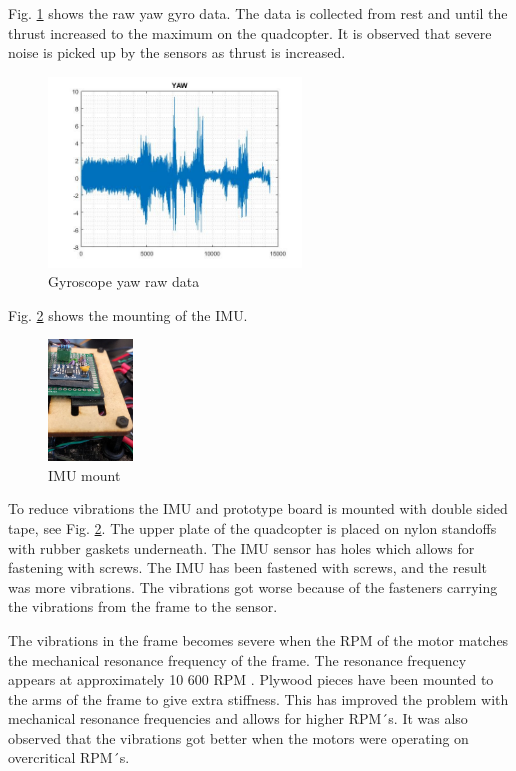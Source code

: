 Fig. \ref{fig:yo} shows the raw yaw gyro data. The data is collected from rest and until the thrust increased to the maximum on the quadcopter. It is observed that severe noise is picked up by the sensors as thrust is increased.
\begin{figure}[H]
    \centering
         \includegraphics[width = 0.6\textwidth]{VAPIQ-PICTURES/YAWshaftTrow.jpg}
      \caption{Gyroscope yaw raw data}
    \label{fig:yo}
\end{figure} 
Fig. \ref{fig:PIKK2} shows the mounting of the IMU. 
\begin{figure}[H]
    \centering
         \includegraphics[width = 0.2\textwidth]{VAPIQ-PICTURES/SensorDritt.jpg}
      \caption{IMU mount}
    \label{fig:PIKK2}
\end{figure} 
To reduce vibrations the IMU and prototype board is mounted with double sided tape, see Fig. \ref{fig:PIKK2}. The upper plate of the quadcopter is placed on nylon standoffs with rubber gaskets underneath. The IMU sensor has holes which allows for fastening with screws. The IMU has been fastened with screws, and the result was more vibrations. The vibrations got worse because of the fasteners carrying the vibrations from the frame to the sensor. \bigskip

The vibrations in the frame becomes severe when the RPM of the motor matches the mechanical resonance frequency of the frame. The resonance frequency appears at approximately 10 600 RPM . Plywood pieces have been mounted to the arms of the frame to give extra stiffness. This has improved the problem with mechanical resonance frequencies and allows for higher RPM´s. It was also observed that the vibrations got better when the motors were operating on overcritical RPM´s.
